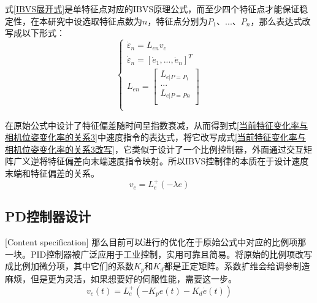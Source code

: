 \documentclass[fontset=fandol,type=bachelor,campus=harbin,bsmainpagenumberline=true]{hithesisbook}
\begin{document}
式\ref{IBVS展开式}是单特征点对应的IBVS原理公式，而至少四个特征点才能保证稳定性\cite{chaumette2006visual}，在本研究中设选取特征点数为$n$，特征点分别为$P_1$、...、$P_n$，那么表达式改写成以下形式：
\begin{equation}
\left\{ \begin{array}{c}
	\dot{\varepsilon}_n=L_{en}v_c\\
	\dot{\varepsilon}_n=\left[ \dot{e}_1,...,\dot{e}_n \right] ^T\\
	L_{en}=\left[ \begin{array}{c}
	L_{e|P=P_1}\\
	...\\
	L_{e|P=Pn}\\
\end{array} \right]\\
\end{array} \right.  
\label{IBVS多特征点展开式}
\end{equation}


在原始公式中设计了特征偏差随时间呈指数衰减，从而得到式\ref{当前特征变化率与相机位姿变化率的关系3}中速度指令的表达式，将它改写成式\ref{当前特征变化率与相机位姿变化率的关系3改写}，它类似于设计了一个比例控制器，外面通过交互矩阵广义逆将特征偏差向末端速度指令映射。所以IBVS控制律的本质在于设计速度末端和特征偏差的关系。
\begin{equation}
v_c=L_{e}^{+}\left( -\lambda e \right) 
\label{当前特征变化率与相机位姿变化率的关系3改写}
\end{equation}

\subsection{PD控制器设计}[Content specification]
那么目前可以进行的优化在于原始公式中对应的比例项那一块。PID控制器被广泛应用于工业控制，实用可靠且简易。将原始的比例项改写成比例加微分项，其中它们的系数$K_p$和$K_d$都是正定矩阵。系数扩维会给调参制造麻烦，但是更为灵活，如果想要好的伺服性能，需要这一步。
\begin{equation}
v_c\left( t \right) =L_{e}^{+}\left( -K_pe\left( t \right) -K_d\dot{e}\left( t \right) \right) 
\label{PD控制律}
\end{equation}
\end{document}
